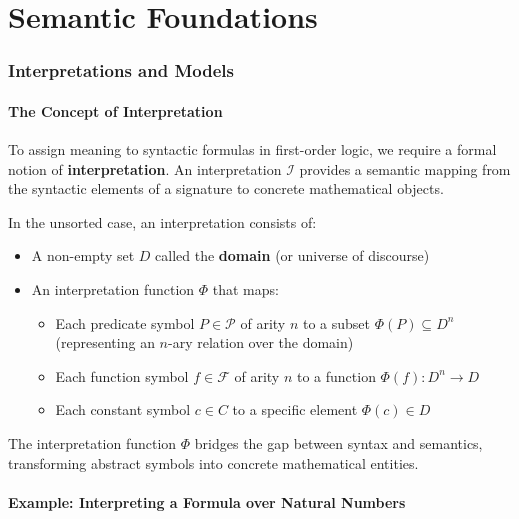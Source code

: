 \documentclass[11pt,a4paper]{article}
\theoremstyle{definition}
\theoremstyle{plain}
\theoremstyle{remark}
\begin{document}
\newpage

\part{Semantic Foundations}

\section{Interpretations and Models}

\subsection{The Concept of Interpretation}

To assign meaning to syntactic formulas in first-order logic, we require a formal notion of \textbf{interpretation}. An interpretation $\mathcal{I}$ provides a semantic mapping from the syntactic elements of a signature to concrete mathematical objects.

\begin{tcolorbox}[colback=purple!5!white,colframe=purple!75!black,title=\textbf{Interpretation Components}]
In the unsorted case, an interpretation consists of:
\begin{itemize}
    \item A non-empty set $D$ called the \textbf{domain} (or universe of discourse)
    \item An interpretation function $\Phi$ that maps:
    \begin{itemize}
        \item Each predicate symbol $P \in \mathcal{P}$ of arity $n$ to a subset $\Phi(P) \subseteq D^n$ (representing an $n$-ary relation over the domain)
        \item Each function symbol $f \in \mathcal{F}$ of arity $n$ to a function $\Phi(f) : D^n \rightarrow D$
        \item Each constant symbol $c \in C$ to a specific element $\Phi(c) \in D$
    \end{itemize}
\end{itemize}
\end{tcolorbox}

The interpretation function $\Phi$ bridges the gap between syntax and semantics, transforming abstract symbols into concrete mathematical entities.

\subsection{Example: Interpreting a Formula over Natural Numbers}
\end{document}

